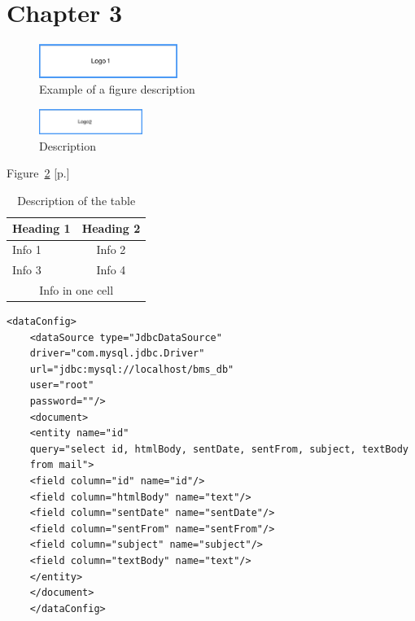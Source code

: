 \section{Chapter 3}\label{main_section_2}

\begin{figure}[htb]
    \centering
    \includegraphics[width=0.4\textwidth,angle=45]{abb/logo1}
    \caption[Example of a figure description]{Example of a figure description\footnotemark}
    \label{fig:example1}
\end{figure}

\begin{figure}[htb]
    \centering
    \includegraphics[width=0.3\textwidth,angle=0]{abb/logo2}
    \caption[Description]{Description \cite[p. 96]{mf2005}}
    \label{fig:description}
\end{figure}

Figure~\ref{fig:description} [p.\pageref{fig:description}]

\begin{table}[!h]
    \begin{center}
        \begin{tabular}{ | l | c | }
            \hline
            Heading 1 & Heading 2 \\ \hline \hline
            Info 1 & Info 2 \\ \hline
            Info 3 & Info 4 \\ \hline
            \hline
            \multicolumn{2}{|c|}{Info in one cell} \\
            \hline
        \end{tabular}
        \caption[Description of the table]{Description of the table \cite[p. 13]{mm2009}}
    \end{center}
\end{table}


\lstset{language=xml}
\begin{lstlisting}[frame=htrbl, caption={The file {\normalfont \ttfamily  data-config.xml} serves as an example for XML source code}, label={lst:dataconfigxml}]
    <dataConfig>
    <dataSource type="JdbcDataSource" 
    driver="com.mysql.jdbc.Driver"
    url="jdbc:mysql://localhost/bms_db"
    user="root" 
    password=""/>
    <document>
    <entity name="id"
    query="select id, htmlBody, sentDate, sentFrom, subject, textBody
    from mail">
    <field column="id" name="id"/>
    <field column="htmlBody" name="text"/>
    <field column="sentDate" name="sentDate"/>
    <field column="sentFrom" name="sentFrom"/>
    <field column="subject" name="subject"/>
    <field column="textBody" name="text"/>
    </entity>
    </document>
    </dataConfig>
\end{lstlisting}

